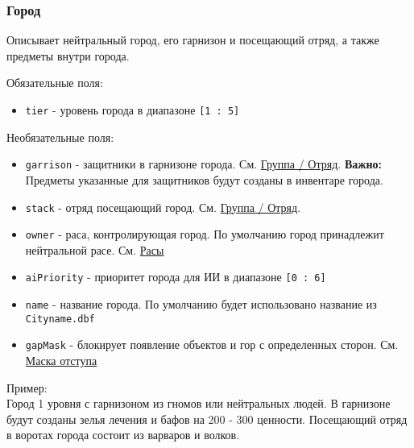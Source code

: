 \subsubsection{Город}
\label{city}
Описывает нейтральный город, его гарнизон и посещающий отряд, а также предметы внутри города.

Обязательные поля:
\begin{itemize}
\item \texttt{tier} - уровень города в диапазоне \texttt{[1 : 5]}
\end{itemize}

Необязательные поля:
\begin{itemize}
\item \texttt{garrison} - защитники в гарнизоне города. См. \hyperref[group]{Группа / Отряд}. \textbf{Важно:} Предметы указанные для защитников будут созданы в инвентаре города.
\item \texttt{stack} - отряд посещающий город. См. \hyperref[group]{Группа / Отряд}.
\item \texttt{owner} - раса, контролирующая город. По умолчанию город принадлежит нейтральной расе. См. \hyperref[raceTypes]{Расы}
\item \texttt{aiPriority} - приоритет города для ИИ в диапазоне \texttt{[0 : 6]}
\item \texttt{name} - название города. По умолчанию будет использовано название из \texttt{Cityname.dbf}
\item \texttt{gapMask} - блокирует появление объектов и гор с определенных сторон. См. \hyperref[gapMask]{Маска отступа}
\end{itemize}

Пример:\\
Город 1 уровня с гарнизоном из гномов или нейтральных людей.
В гарнизоне будут созданы зелья лечения и бафов на 200 - 300 ценности.
Посещающий отряд в воротах города состоит из варваров и волков.

\begin{figure}[H]

\end{figure}